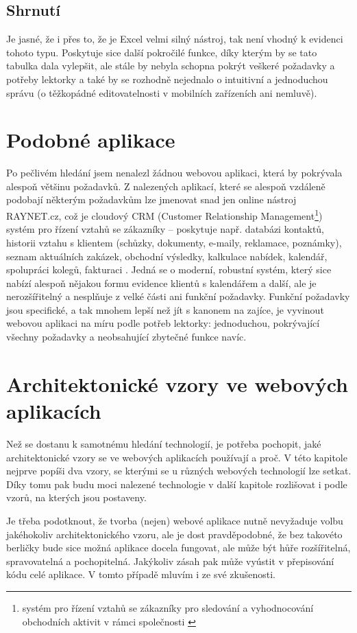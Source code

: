     \section{Shrnutí}
    Je jasné, že i přes to, že je Excel velmi silný nástroj, tak není vhodný k evidenci tohoto typu. Poskytuje sice další pokročilé funkce, díky kterým by se tato tabulka dala vylepšit, ale stále by nebyla schopna pokrýt veškeré požadavky a potřeby lektorky a také by se rozhodně nejednalo o intuitivní a jednoduchou správu (o těžkopádné editovatelnosti v mobilních zařízeních ani nemluvě).
    
\chapter{Podobné aplikace}
Po pečlivém hledání jsem nenalezl žádnou webovou aplikaci, která by pokrývala alespoň většinu požadavků. Z nalezených aplikací, které se alespoň vzdáleně podobají některým požadavkům lze jmenovat snad jen online nástroj RAYNET.cz, což je cloudový CRM (Customer Relationship Management\footnote{systém pro řízení vztahů se zákazníky pro sledování a vyhodnocování obchodních aktivit v rámci společnosti \cite{crm}}) systém pro řízení vztahů se zákazníky -- poskytuje např. databázi kontaktů, historii vztahu s klientem (schůzky, dokumenty, e-maily, reklamace, poznámky), seznam aktuálních zakázek, obchodní výsledky, kalkulace nabídek, kalendář, spolupráci kolegů, fakturaci \cite{raynet}. Jedná se o moderní, robustní systém, který sice nabízí alespoň nějakou formu evidence klientů s kalendářem a další, ale je nerozšířitelný a nesplňuje z velké části ani funkční požadavky. Funkční požadavky jsou specifické, a tak mnohem lepší než jít s kanonem na zajíce, je vyvinout webovou aplikaci na míru podle potřeb lektorky: jednoduchou, pokrývající všechny požadavky a neobsahující zbytečné funkce navíc.

\chapter{Architektonické vzory ve webových aplikacích}
Než se dostanu k samotnému hledání technologií, je potřeba pochopit, jaké architektonické vzory se ve webových aplikacích používají a proč. V této kapitole nejprve popíši dva vzory, se kterými se u různých webových technologií lze setkat. Díky tomu pak budu moci nalezené technologie v další kapitole rozlišovat i podle vzorů, na kterých jsou postaveny.

Je třeba podotknout, že tvorba (nejen) webové aplikace nutně nevyžaduje volbu jakéhokoliv architektonického vzoru, ale je dost pravděpodobné, že bez takovéto berličky bude sice možná aplikace docela fungovat, ale může být hůře rozšířitelná, spravovatelná a pochopitelná. Jakýkoliv zásah pak může vyústit v přepisování kódu celé aplikace. V tomto případě mluvím i ze své zkušenosti.

